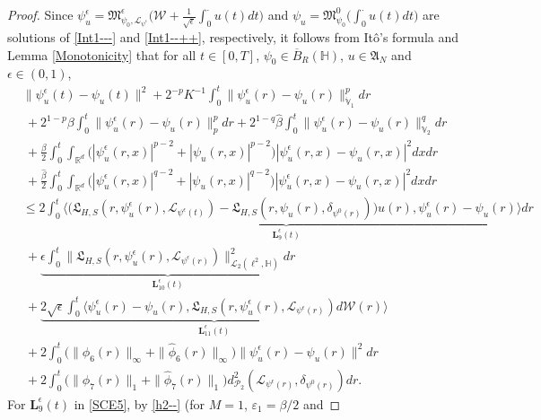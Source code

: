 \documentclass[11pt]{article}
\renewcommand{\leq}{\leqslant}
\numberwithin{equation}{section}
\begin{document}
\begin{proof}
Since $\psi^\epsilon_u=
\mathfrak{M}_{\psi_0,\mathcal{L}_{
\psi^\epsilon}}^\epsilon
\big(\mathcal{W}+\frac{1}{\sqrt{\epsilon}}
\int_0^\cdot u(t)dt\big)$ and $\psi_u=
\mathfrak{M}_{\psi_0}^0
\big(
\int_0^\cdot u(t)dt\big)$ are solutions of \eqref{Int1---} and \eqref{Int1--++}, respectively,
it follows from  It\^{o}'s
formula and
 Lemma \ref{Monotonicity} that for all $t\in[0,T]$, $\psi_{0}\in \overline{B}_{R}(\mathbb{H})$,
$u\in \mathfrak{A}_N$ and $\epsilon\in(0,1)$,
\begin{align}\label{SCE5}
&\|\psi^\epsilon_u(t)
-\psi_u(t)
\|^2+2^{-p}K^{-1}\int_0^{t}
\|\psi^\epsilon_u(r)
-\psi_u(r)\|^p_{\dot{\mathbb{V}}_1}dr
\nonumber\\&\ +2^{1-p}\beta
\int_0^{t}
\|\psi^\epsilon_u(r)
-\psi_u(r)\|_{p}^{p}dr
+2^{1-q}\widehat{\beta}
\int_0^{t}\|\psi^\epsilon_u(r)
-\psi_u(r)\|_{\mathbb{V}_2}^{q}dr
\nonumber\\&\ +\frac{\beta}{2}\int_0^{t} \int_{\mathbb{R}^d}  \big(|\psi^\epsilon_u(r,x)|^{p-2}
+|\psi_u(r,x)|^{p-2}\big)
|\psi^\epsilon_u(r,x)-\psi_u(r,x)|^2dxdr
\nonumber\\&\ +\frac{\widehat{\beta}}{2}
\int_0^{t} \int_{\mathbb{R}^d}  \big(|\psi^\epsilon_u(r,x)|^{q-2}
+|\psi_u(r,x)|^{q-2}\big)
|\psi^\epsilon_u(r,x)-\psi_u(r,x)|^2dxdr
\nonumber\\&\leq
\underbrace{2
\int_0^{t}\big\langle
    \big(\mathfrak{L}_{H,S}(r,\psi^\epsilon_u(r),
\mathcal{L}_{
\psi^\epsilon(t)}) - \mathfrak{L}_{H,S}(r,\psi_u(r),
\delta_{\psi^0(r)})\big)u(r) ,\psi^\epsilon_u(r)
-\psi_u(r)
\big\rangle dr}_{\textbf{L}^\epsilon_9(t)}
\nonumber\\&\ +\underbrace{\epsilon\int_0^{t}
\|\mathfrak{L}_{H,S}(r,\psi^\epsilon_u(r),
\mathcal{L}_{
\psi^\epsilon(r)})
		\|^2_{\mathcal{L}_2(\ell^2,
			\mathbb{H})}dr}_{\textbf{L}^\epsilon_{10}(t)}
\nonumber\\&\ +\underbrace{2\sqrt{\epsilon}
\int_0^{t}\langle
    \psi^\epsilon_u(r)
-\psi_u(r),\mathfrak{L}_{H,S}(r,
\psi^\epsilon_u(r),
\mathcal{L}_{
\psi^\epsilon(r)})d\mathcal{W}(r)
\rangle}_{\textbf{L}^\epsilon_{11}(t)}
\nonumber\\&\ +
2\int_0^{t}
\big(\|\phi_6(r)\|_{\infty}+
\|\widehat{\phi}_6(r)\|_{\infty}\big)
\| \psi^\epsilon_u(r)
-\psi_u(r)
\|^2dr
\nonumber\\&\ +2\int_0^{t}
\big(\|\phi_7(r)\|_{1}+
\|\widehat{\phi}_7(r)\|_{1}\big)
d_{\mathcal{P}_2}^2
(\mathcal{L}_{
\psi^\epsilon(r)},\delta_{\psi^0(r)})dr.
\end{align}
For   $\textbf{L}^\epsilon_{9}(t)$ in \eqref{SCE5}, by \eqref{h2--} (for $M=1$, $\varepsilon_1=\beta/2$ and

\end{proof}
\end{document}
